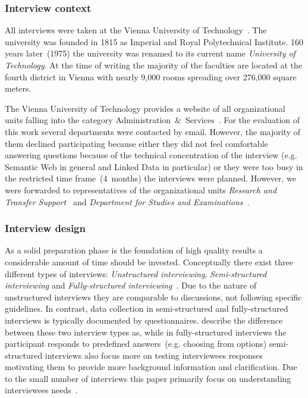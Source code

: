 \documentclass{article}
\begin{document}
\subsubsection{Interview context}
\label{sec:interview_context}
All interviews were taken at the Vienna University of Technology~\cite{url:university-of-technology-vienna}. The university was founded in 1815 as Imperial and Royal Polytechnical Institute. 160 years later~(1975) the university was renamed to its current name \textit{University of Technology}. At the time of writing the majority of the faculties are located at the fourth district in Vienna with nearly 9,000 rooms spreading over 276,000 square meters. 

The Vienna University of Technology provides a website of all organizational units falling into the category Administration~\&~Services~\cite{url:university-list-of-org-units}. For the evaluation of this work several departments were contacted by email. However, the majority of them declined participating because either they did not feel comfortable answering questions because of the technical concentration of the interview (e.g. Semantic Web in general and Linked Data in particular) or they were too busy in the restricted time frame~(4~months) the interviews were planned. However, we were forwarded to representatives of the organizational units \textit{Research and Transfer Support}~\cite{url:university-research-transfer} and \textit{Department for Studies and Examinations}~\cite{url:university-studies-and-examinations}. 
\subsubsection{Interview design}
As a solid preparation phase is the foundation of high quality results a considerable amount of time should be invested. Conceptually there exist three different types of interviews: \textit{Unstructured interviewing}, \textit{Semi-structured interviewing} and \textit{Fully-structured interviewing}~\cite{book:bernard-antropology-semi-structured-interview}. 
Due to the nature of unstructured interviews they are comparable to discussions, not following specific guidelines. In contrast, data collection in semi-structured and fully-structured interviews is typically documented by questionnaires. \citet{article:harris2010mixing} describe the difference between these two interview types as, while in fully-structured interviews the participant responds to predefined answers~(e.g. choosing from options) semi-structured interviews also focus more on testing interviewees responses motivating them to provide more background information and clarification. Due to the small number of interviews this paper primarily focus on understanding interviewees needs~\cite{book:miles2005handbook}.
\end{document}
